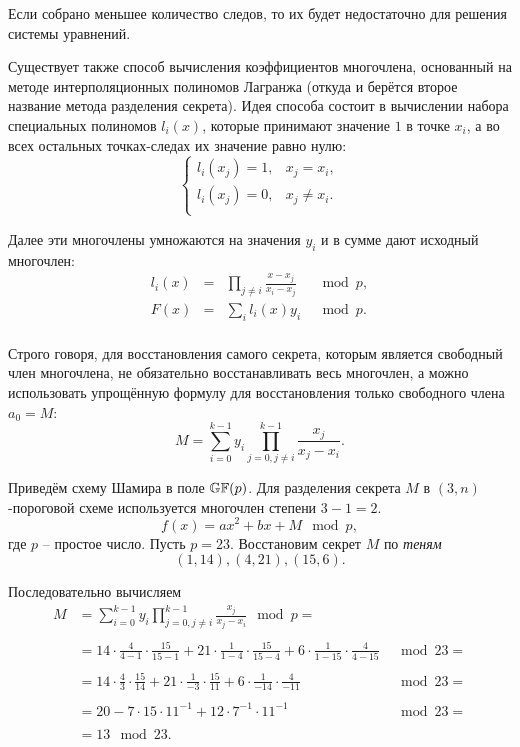 Если собрано меньшее количество следов, то их будет недостаточно для решения системы уравнений.

Существует также способ вычисления коэффициентов многочлена, основанный на методе интерполяционных полиномов Лагранжа (откуда и берётся второе название метода разделения секрета). Идея способа состоит в вычислении набора специальных полиномов $l_i \left( x \right)$, которые принимают значение $1$ в точке $x_i$, а во всех остальных точках-следах их значение равно нулю:
\[ \begin{cases}
	l_i \left( x_j \right) = 1, &x_j = x_i, \\
	l_i \left( x_j \right) = 0, &x_j \ne x_i. \\
\end{cases} \]

Далее эти многочлены умножаются на значения $y_i$ и в сумме дают исходный многочлен:
\[\begin{array}{llll}
  l_i \left( x \right) &=& \prod\limits_{j \ne i} {\frac{{x - x_j }}{{x_i  - x_j }}} &\mod p, \\
  F\left( x \right) &=& \sum\limits_i {l_i \left( x \right)y_i } &\mod p. \\
\end{array}\]

Строго говоря, для восстановления самого секрета, которым является свободный член многочлена, не обязательно восстанавливать весь многочлен, а можно использовать упрощённую формулу для восстановления только свободного члена $a_0 = M$:
    \[ M = \sum\limits_{i=0}^{k-1} y_i \prod\limits_{j=0, j \neq i}^{k-1} \frac{x_j}{x_j - x_i}. \]

\example
Приведём схему Шамира в поле $\mathbb{GF}(p)$. Для разделения секрета $M$ в $(3,n)$-пороговой схеме используется многочлен степени $3-1=2$.
    \[ f(x) = a x^2 + b x + M \mod p, \]
где $p$ -- простое число. Пусть $p=23$. Восстановим секрет $M$ по \emph{теням}
    \[ (1,14), (4,21), (15,6). \]

Последовательно вычисляем
\[\begin{array}{llc}
M &\displaystyle = \sum\limits_{i=0}^{k-1} y_i \prod\limits_{j=0, j \neq i}^{k-1} \frac{x_j}{x_j - x_i} \mod p = & \\
	\\
	&= 14 {\cdot} \frac{4}{4-1} {\cdot} \frac{15}{15-1} + 21 {\cdot} \frac{1}{1-4} {\cdot} \frac{15}{15-4} + 6 {\cdot} \frac{1}{1-15} {\cdot} \frac{4}{4-15} & \mod 23 = \\
	\\
	&\displaystyle = 14 {\cdot} \frac{4}{3} {\cdot} \frac{15}{14} + 21 {\cdot} \frac{1}{-3} {\cdot} \frac{15}{11} + 6 {\cdot} \frac{1}{-14} {\cdot} \frac{4}{-11} & \mod 23 = \\
	\\
	&\displaystyle = 20 - 7 \cdot 15 \cdot 11^{-1} + 12 \cdot 7^{-1} \cdot 11^{-1} & \mod 23 = \\
	\\
	&= 13 \mod 23.
\end{array}\]

\exampleend

